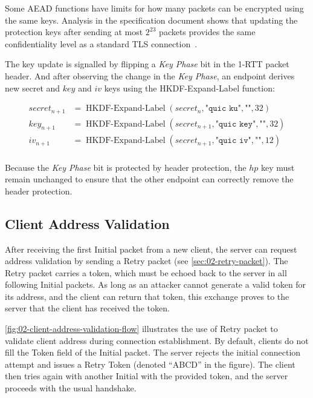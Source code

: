 Some AEAD functions have limits for how many packets can be encrypted using the same keys. Analysis
in the specification document shows that updating the protection keys after sending at most $2^{23}$
packets provides the same confidentiality level as a standard TLS
connection~\cite[Appendix~B]{draft-ietf-quic-tls}.

The key update is signalled by flipping a \textit{Key Phase} bit in the 1-RTT packet header. And
after observing the change in the \textit{Key Phase}, an endpoint derives new secret and $key$ and
$iv$ keys using the HKDF-Expand-Label function:

\begin{equation*}
  \begin{split}
    secret_{n+1} & = \operatorname{HKDF-Expand-Label}(secret_{n}, \texttt{"quic ku"}, \texttt{""}, 32) \\
    key_{n+1} & = \operatorname{HKDF-Expand-Label}(secret_{n+1}, \texttt{"quic key"}, \texttt{""}, 32) \\
    iv_{n+1} & = \operatorname{HKDF-Expand-Label}(secret_{n+1}, \texttt{"quic iv"}, \texttt{""}, 12) \\
  \end{split}
\end{equation*}

Because the \textit{Key Phase} bit is protected by header protection, the $hp$ key must remain
unchanged to ensure that the other endpoint can correctly remove the header protection.

\subsection{Client Address Validation}\label{sec:02-address-validation}

After receiving the first Initial packet from a new client, the server can request address
validation by sending a Retry packet (see \autoref{sec:02-retry-packet}). The Retry packet carries a
token, which must be echoed back to the server in all following Initial packets. As long as an
attacker cannot generate a valid token for its address, and the client can return that token, this
exchange proves to the server that the client has received the token.

\autoref{fig:02-client-address-validation-flow} illustrates the use of Retry packet to validate
client address during connection establishment. By default, clients do not fill the Token field of
the Initial packet. The server rejects the initial connection attempt and issues a Retry Token
(denoted ``ABCD'' in the figure). The client then tries again with another Initial with the provided
token, and the server proceeds with the usual handshake.

